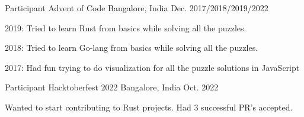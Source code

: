 

\begin{cventries}

  \cventry
    {Participant} %
    {Advent of Code} %
    {Bangalore, India} %
    {Dec. 2017/2018/2019/2022} %
    {
      \begin{cvitems} %
        \item {2019: Tried to learn Rust from basics while solving all the puzzles.}
        \item {2018: Tried to learn Go-lang from basics while solving all the puzzles.}
        \item {2017: Had fun trying to do visualization for all the puzzle solutions in JavaScript}
      \end{cvitems}
    }

  \cventry
    {Participant} %
    {Hacktoberfest 2022} %
    {Bangalore, India} %
    {Oct. 2022} %
    {
      \begin{cvitems} %
        \item {Wanted to start contributing to Rust projects. Had 3 successful PR's accepted.}
      \end{cvitems}
    }

\end{cventries}
